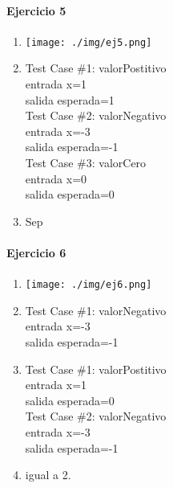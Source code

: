 \documentclass{article}
\begin{document}
\paragraph{Ejercicio 5}

\begin{multicols}{2}
\begin{enumerate}
\item \texttt{[image: ./img/ej5.png]}
\item 
Test Case \#1: valorPostitivo\\
\hspace*{6mm}entrada x=1\\
\hspace*{6mm}salida esperada=1\medskip\\
Test Case \#2: valorNegativo\\
\hspace*{6mm}entrada x=-3\\
\hspace*{6mm}salida esperada=-1\medskip\\
Test Case \#3: valorCero\\
\hspace*{6mm}entrada x=0\\
\hspace*{6mm}salida esperada=0\medskip\\
\item	Sep
\end{enumerate}
\end{multicols}

\paragraph{Ejercicio 6}

\begin{multicols}{2}
\begin{enumerate}
\item \texttt{[image: ./img/ej6.png]}
\item 
Test Case \#1: valorNegativo\\
\hspace*{6mm}entrada x=-3\\
\hspace*{6mm}salida esperada=-1\medskip\\

\item	
Test Case \#1: valorPostitivo\\
\hspace*{6mm}entrada x=1\\
\hspace*{6mm}salida esperada=0\medskip\\
Test Case \#2: valorNegativo\\
\hspace*{6mm}entrada x=-3\\
\hspace*{6mm}salida esperada=-1\medskip\\
\item igual a 2.
\end{enumerate}
\end{multicols}
\end{document}
